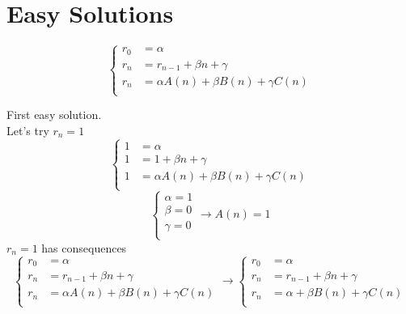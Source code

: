 \section{Easy Solutions}
\begin{equation*}
    \left\{
        \begin{array}{ll}
            r_0 &= \alpha\\
            r_n &= r_{n-1}+\beta n+\gamma\\
            r_n &= \alpha A(n) + \beta B(n) + \gamma C(n)\\
        \end{array}
    \right.
\end{equation*}

First easy solution.\\
Let's try $ r_n = 1 $ 
\begin{equation*}
    \left\{
        \begin{array}{ll}
            1 &= \alpha\\
            1 &= 1+\beta n+\gamma\\
            1 &= \alpha A(n) + \beta B(n) + \gamma C(n)\\
        \end{array}
    \right.
\end{equation*}
\begin{equation*}
    \left\{
        \begin{array}{l}
            \alpha = 1\\
            \beta = 0\\
            \gamma = 0\\
        \end{array}
    \right.
    \rightarrow A(n) = 1
\end{equation*}
$ r_n=1 $ has consequences
\begin{equation*}
    \left\{
        \begin{array}{ll}
            r_0 &= \alpha\\
            r_n &= r_{n-1}+\beta n+\gamma\\
            r_n &= \alpha A(n) + \beta B(n) + \gamma C(n)\\
        \end{array}
    \right.
    \rightarrow
    \left\{
        \begin{array}{ll}
            r_0 &= \alpha\\
            r_n &= r_{n-1}+\beta n+\gamma\\
            r_n &= \alpha + \beta B(n) + \gamma C(n)\\
        \end{array}
    \right.
\end{equation*}


